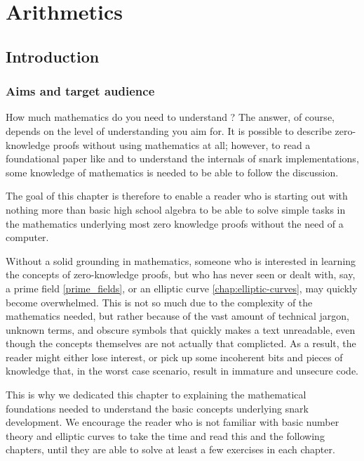 \chapter{Arithmetics}\label{chap:arithmetics}

\section{Introduction}

\subsection{Aims and target audience}

How much mathematics do you need to understand ? The answer, of course, depends on the level of understanding you aim for. It is possible to describe zero-knowledge proofs without using mathematics at all; however, to read a foundational paper like \cite{Groth16} and to understand the internals of snark implementations, some knowledge of mathematics is needed to be able to follow the discussion. 

The goal of this chapter is therefore to enable a reader who is starting out with nothing more than basic high school algebra to be able to solve simple tasks in the mathematics underlying most zero knowledge proofs without the need of a computer.

Without a solid grounding in mathematics, someone who is interested in learning the concepts of zero-knowledge proofs, but who has never seen or dealt with, say, a prime field \ref{prime_fields}, or an elliptic curve \ref{chap:elliptic-curves}, may quickly become overwhelmed. This is not so much due to the complexity of the mathematics needed, but rather because of the vast amount of technical jargon, unknown terms, and obscure symbols that quickly makes a text unreadable, even though the concepts themselves are not actually that complicted. As a result, the reader might either lose interest, or pick up some incoherent bits and pieces of knowledge that, in the worst case scenario, result in immature and unsecure code. 

This is why we dedicated this chapter to explaining the mathematical foundations needed to understand the basic concepts underlying snark development. We encourage the reader who is not familiar with basic number theory and elliptic curves to take the time and read this and the following chapters, until they are able to solve at least a few exercises in each chapter.


